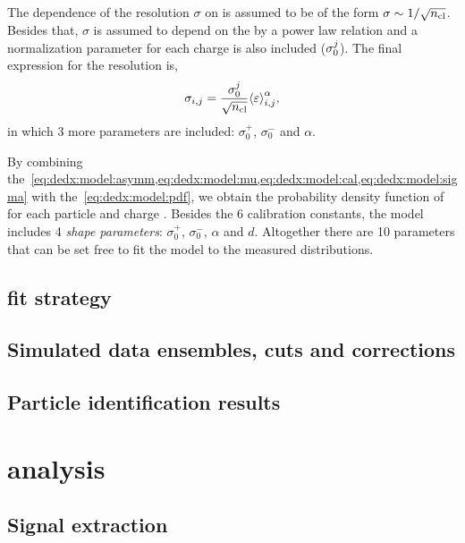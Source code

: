 The dependence of the resolution $\sigma$ on \ncl is assumed to be of the form
$\sigma \sim 1/\sqrt{\mbox{$n_{\text{cl}}$}}$. Besides that, $\sigma$ is assumed to depend
on the \meaneps by a power law relation and a normalization parameter for
each charge is also included ($\sigma_0^{j}$). The final expression for the resolution is,
\begin{equation}
  \sigma_{i,j} = \frac{\sigma_0^{j}}{\sqrt{\mbox{$n_{\text{cl}}$}}} \mbox{$\langle\varepsilon\rangle$}_{i,j}^{\alpha},
  \label{eq:dedx:model:sigma}
\end{equation}
in which 3 more parameters are included: $\sigma_0^+$, $\sigma_0^-$ and $\alpha$. 

By combining
the~\cref{eq:dedx:model:asymm,eq:dedx:model:mu,eq:dedx:model:cal,eq:dedx:model:sigma}
with the~\cref{eq:dedx:model:pdf}, we obtain the probability density
function of \eps for each particle \ipart and charge \ich. Besides the 6 calibration constants,
the model includes 4 \textit{shape parameters}: $\sigma_0^+$, $\sigma_0^-$, $\alpha$ and $d$.
Altogether there are 10 parameters that can be set free to fit the model
to the measured \eps distributions.


\subsection{\dedx fit strategy}
\label{sec:hadron:dedx:fit}


\subsection{Simulated data ensembles, cuts and corrections}
\label{sec:hadron:dedx:sde}


\subsection{Particle identification results}
\label{sec:hadron:dedx:results}



\section{\vzero analysis}


\subsection{Signal extraction}


